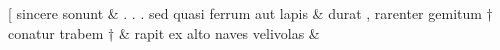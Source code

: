 \documentclass[12pt,onecolumn,twoside,a4paper]{memoir}
\begin{document}
\begin{pairs}
\begin{Leftside}
                              [
                              sincere
                              sonunt \&
                         \stanza .
                              .
                              .
                              sed
                              quasi
                              ferrum
                              aut
                              lapis &
                     durat
                              ,
                              rarenter
                              gemitum
                              †
                              conatur
                              trabem
                              † \&
                         \stanza 
                     rapit
                              ex
                              alto
                              naves
                              velivolas \&
                     
                  \endnumbering
		\end{Leftside}
                  \begin{Rightside}
			\beginnumbering
			\numberstanzafalse
                     

\end{Rightside}
\end{pairs}
\end{document}
